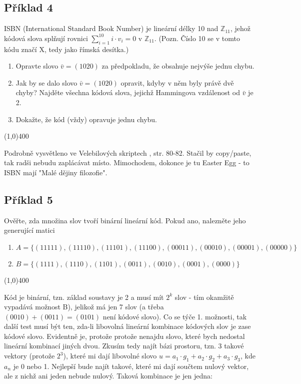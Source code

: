 \documentclass{article}
\begin{document}
\subsection{Příklad 4}
ISBN (International Standard Book Number) je lineární délky 10 nad $\mathbb{Z}_{11}$, jehož kódová slova splňují rovnici $\sum_{i=1}^{10}{i\cdot v_i = 0 \mbox{ v } \mathbb{Z}_{11}}$. (Pozn. Číslo 10 se v tomto kódu značí X, tedy jako římská desítka.)

\begin{enumerate}
	\item Opravte slovo $\bar{v} = (1020)$ za předpokladu, že obsahuje nejvýše jednu chybu.
	\item Jak by se dalo slovo $\bar{v} = (1020)$ opravit, kdyby v něm byly právě dvě chyby? Najděte všechna kódová slova, jejichž Hammingova vzdálenost od $\bar{v}$ je 2.
	\item Dokažte, že kód (vždy) opravuje jednu chybu.
\end{enumerate}

\line(1,0){400}

Podrobně vysvětleno ve Velebilových skriptech \cite{velebil07}, str. 80-82. Stačil by copy/paste, tak radši nebudu zaplácávat místo. Mimochodem, dokonce je tu Easter Egg - to ISBN mají "Malé dějiny filozofie".

\subsection{Příklad 5}
Ověřte, zda množina slov tvoří binární lineární kód. Pokud ano, nalezněte jeho generující matici

\begin{enumerate}
	\item $A = \{(11111),(11110),(11101),(11100),(00011),(00010),(00001),(00000)\}$
	\item $B = \{(1111),(1110),(1101),(0011),(0010),(0001),(0000)\}$
\end{enumerate}

\line(1,0){400}

Kód je binární, tzn. základ soustavy je 2 a musí mít $2^k$ slov - tím okamžitě vypadává možnost B), jelikož má jen 7 slov (a třeba $(0010)+(0011)=(0101)$ není kódové slovo). Co se týče 1. možnosti, tak další test musí být ten, zda-li libovolná lineární kombinace kódových slov je zase kódové slovo. Evidentně je, protože protože nenajdu slovo, které bych nedostal lineární kombinací jiných dvou. Zkusím tedy najít bázi prostoru, tzn. 3 takové vektory (protože $2^3$), které mi dají libovolné slovo $u = a_1 \cdot g_1 + a_2 \cdot g_2 + a_3 \cdot g_3$, kde $a_n$ je 0 nebo 1. Nejlepší bude najít takové, které mi dají součtem nulový vektor, ale z nichž ani jeden nebude nulový. Taková kombinace je jen jedna:
\end{document}
